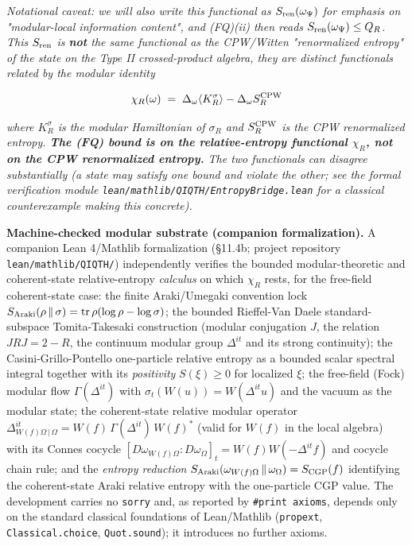 \documentclass[11pt,a4paper]{article}
\begin{document}
\emph{Notational caveat: we will also write this functional as $S_{\rm ren}(\omega_\Psi)$ for emphasis on "modular-local information content", and (FQ)(ii) then reads $S_{\rm ren}(\omega_\Psi) \le Q_R$. This $S_{\rm ren}$ is \textbf{not} the same functional as the CPW/Witten "renormalized entropy" of the state on the Type II crossed-product algebra, they are distinct functionals related by the modular identity}

\[
\chi_R(\omega) \;=\; \Delta_\omega \langle K_R^\sigma \rangle - \Delta_\omega S_R^{\rm CPW}
\]

\emph{where $K_R^\sigma$ is the modular Hamiltonian of $\sigma_R$ and $S_R^{\rm CPW}$ is the CPW renormalized entropy. \textbf{The (FQ) bound is on the relative-entropy functional $\chi_R$, not on the CPW renormalized entropy.} The two functionals can disagree substantially (a state may satisfy one bound and violate the other; see the formal verification module \texttt{lean/mathlib/QIQTH/EntropyBridge.lean} for a classical counterexample making this concrete).}

\textbf{Machine-checked modular substrate (companion formalization).} A companion Lean 4/Mathlib formalization (§11.4b; project repository \texttt{lean/mathlib/QIQTH/}) independently verifies the bounded modular-theoretic and coherent-state relative-entropy \emph{calculus} on which $\chi_R$ rests, for the free-field coherent-state case: the finite Araki/Umegaki convention lock $S_{\rm Araki}(\rho\,\|\,\sigma)=\operatorname{tr}\rho(\log\rho-\log\sigma)$; the bounded Rieffel-Van Daele standard-subspace Tomita-Takesaki construction (modular conjugation $J$, the relation $JRJ=2-R$, the continuum modular group $\Delta^{it}$ and its strong continuity); the Casini-Grillo-Pontello one-particle relative entropy as a bounded scalar spectral integral together with its \emph{positivity} $S(\xi)\ge 0$ for localized $\xi$; the free-field (Fock) modular flow $\Gamma(\Delta^{it})$ with $\sigma_t(W(u))=W(\Delta^{it}u)$ and the vacuum as the modular state; the coherent-state relative modular operator $\Delta^{it}_{W(f)\Omega\,|\,\Omega}=W(f)\,\Gamma(\Delta^{it})\,W(f)^*$ (valid for $W(f)$ in the local algebra) with its Connes cocycle $[D\omega_{W(f)\Omega}:D\omega_\Omega]_t=W(f)W(-\Delta^{it}f)$ and cocycle chain rule; and the \emph{entropy reduction} $S_{\rm Araki}(\omega_{W(f)\Omega}\,\|\,\omega_\Omega)=S_{\rm CGP}(f)$ identifying the coherent-state Araki relative entropy with the one-particle CGP value. The development carries no \texttt{sorry} and, as reported by \texttt{\#print axioms}, depends only on the standard classical foundations of Lean/Mathlib (\texttt{propext}, \texttt{Classical.choice}, \texttt{Quot.sound}); it introduces no further axioms.
\end{document}
